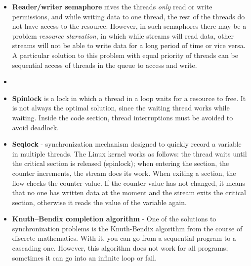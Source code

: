 {\begin{itemize}
			\item\textbf{Reader/writer semaphore} пives the threads \textit{only} read or write permissions, and while writing data to one thread, the rest of the threads do not have access to the resource. However, in such semaphores there may be a problem \textit{resource starvation}, in which while streams will read data, other streams will not be able to write data for a long period of time or vice versa. A particular solution to this problem with equal priority of threads can be sequential access of threads in the queue to access and write.
			\item{}
			\item\textbf{Spinlock} is a  lock in which a thread in a loop waits for a resource to free. It is not always the optimal solution, since the waiting thread works while waiting. Inside the code section, thread interruptions must be avoided to avoid deadlock.
			\item\textbf{Seqlock} - synchronization mechanism designed to quickly record a variable in multiple threads. The Linux kernel works as follows: the thread waits until the critical section is released (spinlock); when entering the section, the counter increments, the stream does its work. When exiting a section, the flow checks the counter value. If the counter value has not changed, it means that no one has written data at the moment and the stream exits the critical section, otherwise it reads the value of the variable again.
			\item\textbf{Knuth–Bendix сompletion algorithm} - One of the solutions to synchronization problems is the Knuth-Bendix algorithm from the course of discrete mathematics. With it, you can go from a sequential program to a cascading one. However, this algorithm does not work for all programs; sometimes it can go into an infinite loop or fail.

\end{itemize}}
